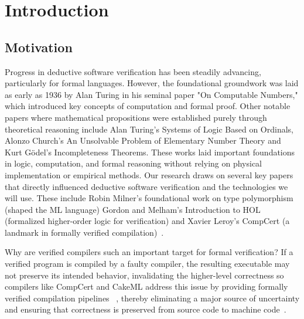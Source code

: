 
%

\chapter{Introduction}
\label{cha:introduction}


\section{Motivation}
\label{sec:Motivation}


Progress in deductive software verification has been steadily advancing, particularly for formal languages. 
However, the foundational groundwork was laid as early as 1936 by Alan Turing in his seminal paper "On Computable Numbers," 
which introduced key concepts of computation and formal proof. Other notable papers where mathematical propositions were 
established purely through theoretical reasoning include Alan Turing's Systems of Logic Based on Ordinals, Alonzo Church's 
An Unsolvable Problem of Elementary Number Theory and Kurt Gödel's Incompleteness Theorems. These works laid important 
foundations in logic, computation, and formal reasoning without relying on physical implementation or empirical methods.
Our research draws on several key papers that directly influenced deductive software verification and the technologies 
we will use. These include Robin Milner's foundational work on type polymorphism (shaped the ML language) Gordon and 
Melham's Introduction to HOL (formalized higher-order logic for verification) and Xavier Leroy's CompCert (a landmark 
in formally verified compilation)~\cite{Turing37, Turing38}. 

Why are verified compilers such an important target for formal verification? If a verified program is compiled by a 
faulty compiler, the resulting executable may not preserve its intended behavior, invalidating the higher-level correctness 
so compilers like CompCert and CakeML address this issue by providing formally verified compilation pipelines
~\cite{LoowKTMNAF19, GrossEPPC22, Leroy09}, thereby eliminating a major source of uncertainty and ensuring that correctness is 
preserved from source code to machine code~\cite{LeroyCompilerMeaning}.

